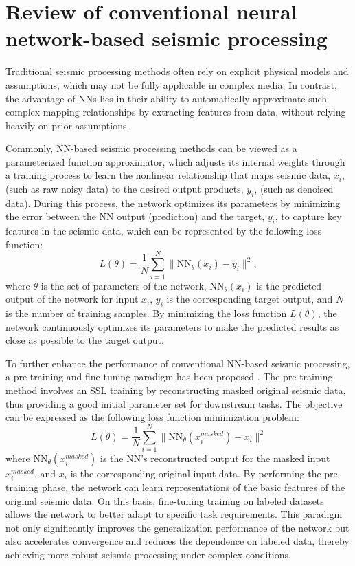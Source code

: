 \section{Review of conventional neural network-based seismic processing}
Traditional seismic processing methods often rely on explicit physical models and assumptions, which may not be fully applicable in complex media. In contrast, the advantage of NNs lies in their ability to automatically approximate such complex mapping relationships by extracting features from data, without relying heavily on prior assumptions.

Commonly, NN-based seismic processing methods can be viewed as a parameterized function approximator, which adjusts its internal weights through a training process to learn the nonlinear relationship that maps seismic data, $x_i$, (such as raw noisy data) to the desired output products, $y_i$, (such as denoised data). During this process, the network optimizes its parameters by minimizing the error between the NN output (prediction) and the target, $y_i$, to capture key features in the seismic data, which can be represented by the following loss function:
\begin{equation}\label{eq1}
L(\theta) = \frac{1}{N} \sum_{i=1}^N \| \text{NN}_\theta(x_i) - y_i \|^2,
\end{equation}
where $\theta$ is the set of parameters of the network, $\text{NN}_\theta(x_i)$ is the predicted output of the network for input $x_i$, $y_i$ is the corresponding target output, and $N$ is the number of training samples. By minimizing the loss function $L(\theta)$, the network continuously optimizes its parameters to make the predicted results as close as possible to the target output. 

To further enhance the performance of conventional NN-based seismic processing, a pre-training and fine-tuning paradigm has been proposed \citep{harsuko2022storseismic, sheng2023seismic}. The pre-training method involves an SSL training by reconstructing masked original seismic data, thus providing a good initial parameter set for downstream tasks. The objective can be expressed as the following loss function minimization problem:
\begin{equation}\label{eq2}
L(\theta) = \frac{1}{N} \sum_{i=1}^N \| \text{NN}_\theta(x_i^{masked}) - x_i \|^2
\end{equation}
where $\text{NN}_\theta(x_i^{masked})$ is the NN's reconstructed output for the masked input $x_i^{masked}$, and $x_i$ is the corresponding original input data. By performing the pre-training phase, the network can learn representations of the basic features of the original seismic data. On this basis, fine-tuning training on labeled datasets allows the network to better adapt to specific task requirements. This paradigm not only significantly improves the generalization performance of the network but also accelerates convergence and reduces the dependence on labeled data, thereby achieving more robust seismic processing under complex conditions. 

